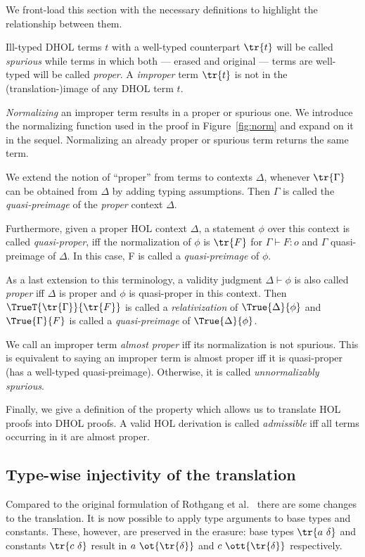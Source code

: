 We front-load this section with the necessary definitions to highlight the relationship between
them.

\begin{definition}
Ill-typed DHOL terms \(t\) with a well-typed counterpart \(\tr{t}\)  will be called
\emph{spurious} while terms in which both --- erased and original --- terms are well-typed will be
called \emph{proper}. A \emph{improper} term \(\tr{t}\) is not in the
(translation-)image of any DHOL term \(t\).

\emph{Normalizing} an improper term results in a proper or spurious one. We introduce the
normalizing function used in the proof in Figure~\ref{fig:norm} and expand on it in the
sequel. Normalizing an already proper or spurious term returns the same term.

We extend the notion of ``proper'' from terms to contexts \(\Delta\), whenever \(\tr{\Gamma}\)
can be obtained from \(\Delta\) by adding typing assumptions. Then \(\Gamma\) is called the
\emph{quasi-preimage} of the \emph{proper} context \(\Delta\).

Furthermore, given a proper HOL context \(\Delta\), a statement \(\phi\) over this context is
called \emph{quasi-proper}, iff the normalization of \(\phi\) is \(\tr{F}\) for \(\Gamma
\vdash F : o\) and \(\Gamma\) quasi-preimage of \(\Delta\). In this case, F is called a
\emph{quasi-preimage} of \(\phi\).

As a last extension to this terminology, a validity judgment \(\Delta \vdash \phi\) is also
called \emph{proper} iff \(\Delta\) is proper and \(\phi\) is quasi-proper in this
context. Then \(\TrueT{\tr{\Gamma}}{\tr{F}}\) is called a \emph{relativization} of
\(\True{\Delta}{\phi}\) and \(\True{\Gamma}{F}\) is called a \emph{quasi-preimage} of
\(\True{\Delta}{\phi}\). 

We call an improper term \emph{almost proper} iff its normalization is not spurious. This is
equivalent to saying an improper term is almost proper iff it is quasi-proper (has a well-typed
quasi-preimage). Otherwise, it is called \emph{unnormalizably spurious}.

Finally, we give a definition of the property which allows us to translate HOL proofs into DHOL proofs. A valid HOL derivation is called \textit{admissible} iff all terms occurring in it are almost proper.
\end{definition}

\subsection{Type-wise injectivity of the translation}
Compared to the original formulation of Rothgang et al.~\cite{RRB23ext} there are some changes to
the translation. It is now possible to apply type arguments to base types and
constants. These, however, are preserved in the erasure: base types \(\tr{a\ \delta}\)
and constants \(\tr{c\ \delta}\) result in \(a\ \ot{\tr{\delta}}\) and \(c\
\ott{\tr{\delta}}\) respectively.


